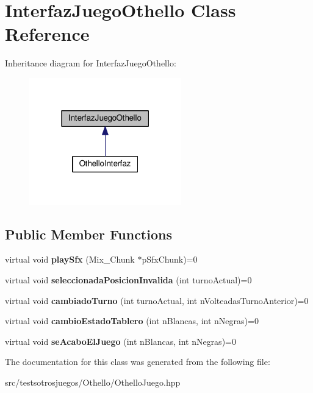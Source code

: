 \hypertarget{class_interfaz_juego_othello}{}\section{Interfaz\+Juego\+Othello Class Reference}
\label{class_interfaz_juego_othello}


Inheritance diagram for Interfaz\+Juego\+Othello\+:
\nopagebreak
\begin{figure}[H]
\begin{center}
\leavevmode
\includegraphics[width=187pt]{class_interfaz_juego_othello__inherit__graph}
\end{center}
\end{figure}
\subsection*{Public Member Functions}
\begin{DoxyCompactItemize}
\item 
virtual void {\bfseries play\+Sfx} (Mix\+\_\+\+Chunk $\ast$p\+Sfx\+Chunk)=0\hypertarget{class_interfaz_juego_othello_ac76194183988304d072f51f7a012de6a}{}\label{class_interfaz_juego_othello_ac76194183988304d072f51f7a012de6a}

\item 
virtual void {\bfseries seleccionada\+Posicion\+Invalida} (int turno\+Actual)=0\hypertarget{class_interfaz_juego_othello_a4a1d8cb6abc160c2d6ed853678f680b4}{}\label{class_interfaz_juego_othello_a4a1d8cb6abc160c2d6ed853678f680b4}

\item 
virtual void {\bfseries cambiado\+Turno} (int turno\+Actual, int n\+Volteadas\+Turno\+Anterior)=0\hypertarget{class_interfaz_juego_othello_a8fd097ef782d8151a3d27d396e98174d}{}\label{class_interfaz_juego_othello_a8fd097ef782d8151a3d27d396e98174d}

\item 
virtual void {\bfseries cambio\+Estado\+Tablero} (int n\+Blancas, int n\+Negras)=0\hypertarget{class_interfaz_juego_othello_aecf123771836b60b83839523770ef163}{}\label{class_interfaz_juego_othello_aecf123771836b60b83839523770ef163}

\item 
virtual void {\bfseries se\+Acabo\+El\+Juego} (int n\+Blancas, int n\+Negras)=0\hypertarget{class_interfaz_juego_othello_a54efd75197e1def2a8f70f35ba7b970e}{}\label{class_interfaz_juego_othello_a54efd75197e1def2a8f70f35ba7b970e}

\end{DoxyCompactItemize}


The documentation for this class was generated from the following file\+:\begin{DoxyCompactItemize}
\item 
src/testsotrosjuegos/\+Othello/Othello\+Juego.\+hpp\end{DoxyCompactItemize}
